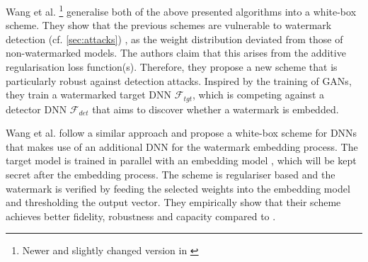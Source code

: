 Wang et al. \cite{wang_robust_2020}\footnote{Newer and slightly changed version in \cite{wang_riga_2020}} generalise both of the above presented algorithms into a white-box scheme. They show that the previous schemes are vulnerable to watermark detection (cf. \cref{sec:attacks})%
, as the weight distribution deviated from those of non-watermarked models. The authors claim that this arises from the additive regularisation loss function(s). Therefore, they propose a new scheme that is particularly robust against detection attacks.
Inspired by the training of GANs, they train a watermarked target DNN $\mathcal{F}_{tgt}$, which is competing against a detector DNN $\mathcal{F}_{det}$ that aims to discover whether a watermark is embedded.

Wang et al. \cite{wang_watermarking_2020} follow a similar approach and propose a white-box scheme for DNNs that makes use of an additional DNN for the watermark embedding process. The target model is trained in parallel with an embedding model%
, which will be kept secret after the embedding process. %
The scheme is regulariser based and the watermark is verified by feeding the selected weights into the embedding model and thresholding the output vector. %
They empirically show that their scheme achieves better fidelity, robustness and capacity compared to \cite{uchida_embedding_2017}.

